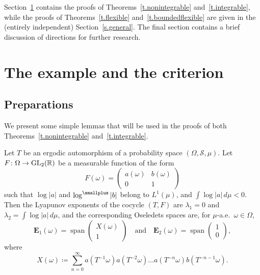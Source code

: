 \documentclass[AHL,Unicode,longabstracts,published]{cedram}
\DeclareMathOperator{\spann}{span}
\newcommand{\R}{\mathbb{R}}
\newcommand{\E}{\mathbf{E}}
\newcommand{\clS}{\mathcal{S}}
\DeclareMathOperator{\GL}{GL}
\renewcommand*{\to}{\mathchoice{\longrightarrow}{\rightarrow}{\rightarrow}{\rightarrow}}
\DeclareMathOperator{\GL}{GL}
\newcommand{\R}{\mathbb{R}}
\begin{document}
Section~\ref{s.iid} contains the proofs of Theorems~\ref{t.nonintegrable} and~\ref{t.integrable}, while the proofs of Theorems~\ref{t.flexible} and~\ref{t.boundedflexible} are given in the (entirely independent) Section~\ref{s.general}. The final section contains a brief discussion of directions for further research.



\section{The example and the criterion}\label{s.iid}

\subsection{Preparations}

We present some simple lemmas that will be used in the proofs of both Theorems~\ref{t.nonintegrable} and~\ref{t.integrable}.

\begin{lemm} \label{l.triangular}
Let $T$ be an ergodic automorphism of a probability space $(\Omega,\clS,\mu)$. Let $F \colon \Omega \to \GL_2(\R)$ be a measurable function of the form
\begin{equation}
F(\omega) =
\begin{pmatrix} 
a(\omega) & b(\omega) \\ 0 & 1
\end{pmatrix}
\end{equation}
such that $\log|a|$ and $\log^{\smallplus} |b|$ belong to $L^1(\mu)$, and $\int \log|a| \, d\mu < 0$. Then the Lyapunov exponents of the cocycle $(T,F)$ are $\lambda_1 = 0$ and $\lambda_2 = \int \log|a| \, d\mu$, and the corresponding Oseledets spaces are, for $\mu$-a.e.~$\omega \in \Omega$,
\begin{equation}
\E_1(\omega) = \spann
\begin{pmatrix} 
X(\omega) \\ 1
\end{pmatrix} 
\quad \text{and} \quad
\E_2(\omega) = \spann 
\begin{pmatrix}
1 \\ 0
\end{pmatrix},
\end{equation}
where
\begin{equation}\label{e.X_series}
X(\omega) \coloneqq \sum_{n=0}^\infty a\left(T^{-1} \omega\right) a\left(T^{-2} \omega\right)\dots a\left(T^{-n} \omega\right) b\left(T^{-n-1} \omega\right).
\end{equation}
\end{lemm}
\end{document}
